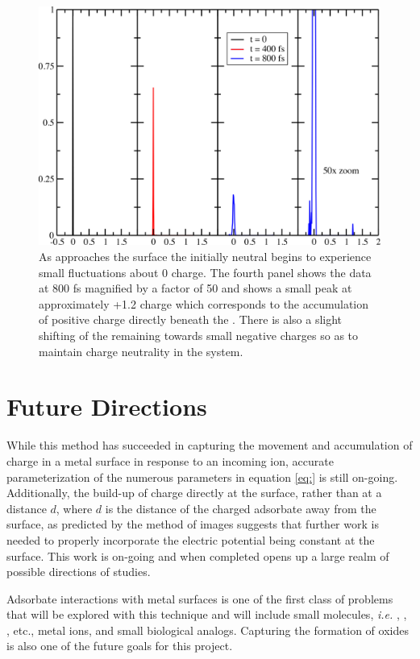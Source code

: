 \begin{figure}
  \centering
  \includegraphics[width=0.75\linewidth]{../figures/chap5/chargeHistogram.pdf}
  \caption{As  approaches the surface the initially neutral 
begins to experience small fluctuations about 0 charge. The fourth panel shows
the data at 800 fs magnified by a factor of 50 and shows a small peak at
approximately +1.2 charge which corresponds to the accumulation of positive
charge directly beneath the . There is also a slight shifting of the
remaining  towards small negative charges so as to maintain charge
neutrality in the system.}
\label{fig:chargeHistogram}
\end{figure}


\section{Future Directions}
While this method has succeeded in capturing the movement and accumulation of
charge in a metal surface in response to an incoming ion, accurate
parameterization of the numerous parameters in equation \ref{eq:} is still
on-going. Additionally, the build-up of charge directly at the surface, rather
than at a distance $d$, where $d$ is the distance of the charged adsorbate away
from the surface, as predicted by the method of images suggests that further
work is needed to properly incorporate the electric potential being constant at
the surface. This work is on-going and when completed opens up a large realm of
possible directions of studies.

Adsorbate interactions with metal surfaces is one of the first class of
problems that will be explored with this technique and will include small
molecules, {\em i.e.} , , , etc., metal ions, and small
biological analogs. Capturing the formation of oxides is also one of the future
goals for this project. 



